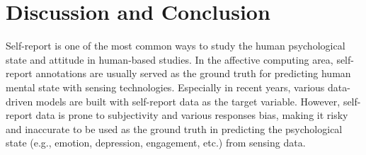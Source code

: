 \documentclass[sigconf]{acmart}
\begin{document}
\begin{comment}
Figure \ref{fig:impact_lent_anno} shows the impact of different class length on the perceived engagement measurement. It seems like students have higher multidimensional engagement on short classes based on their self-report responses. Then we show the impact of class length (i.e., long and short) on the physiologically measured engagement in Figure \ref{fig:impact_len}. We find that students have higher average heart rate, STD of heart rate and average EDA level in short classes while lower skin temperature than in long classes. The possible reasons may be two folds: (1) students physiological-measured engagement are not in line with their perceived engagement; (2) the average skin temperature may not be the good metrics for inferring the student engagement and more effective physiological metrics should be explored in the future.


\end{comment}









\section{Discussion and Conclusion}
\label{sec:conclusion}
Self-report is one of the most common ways to study the human psychological state and attitude in human-based studies. In the affective computing area, self-report annotations are usually served as the ground truth for predicting human mental state with sensing technologies. Especially in recent years, various data-driven models are built with self-report data as the target variable. However, self-report data is prone to  subjectivity and various responses bias, making it risky and inaccurate to be used as the ground truth in predicting the psychological state (e.g., emotion, depression, engagement, etc.) from sensing data.
\end{document}
